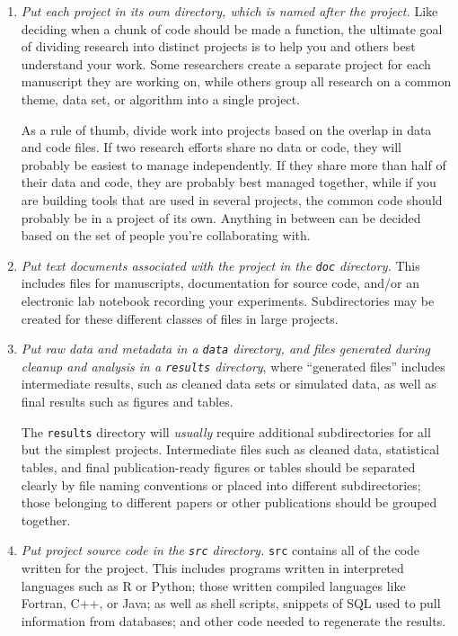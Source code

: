 \documentclass[10pt]{article}
\newcommand{\recommend}[1]{\textit{#1}}
\begin{document}
\begin{enumerate}

\item
  \recommend{Put each project in its own directory, which is named
    after the project.}  Like deciding when a chunk of code should be
  made a function, the ultimate goal of dividing research into
  distinct projects is to help you and others best understand your
  work. Some researchers create a separate project for each manuscript
  they are working on, while others group all research on a common
  theme, data set, or algorithm into a single project.

  As a rule of thumb, divide work into projects based on the overlap
  in data and code files. If two research efforts share no data or
  code, they will probably be easiest to manage independently. If they
  share more than half of their data and code, they are probably best
  managed together, while if you are building tools that are used in
  several projects, the common code should probably be in a project of
  its own. Anything in between can be decided based on the set of
  people you're collaborating with.

\item
  \recommend{Put text documents associated with the project in the
    \texttt{doc} directory.} This includes files for manuscripts,
  documentation for source code, and/or an electronic lab notebook
  recording your experiments.  Subdirectories may be created for these
  different classes of files in large projects.

\item
  \recommend{Put raw data and metadata in a \texttt{data} directory,
    and files generated during cleanup and analysis in a
    \texttt{results} directory}, where ``generated files'' includes
  intermediate results, such as cleaned data sets or simulated data,
  as well as final results such as figures and tables.

  The \texttt{results} directory will \emph{usually}
  require additional subdirectories for all but the simplest
  projects. Intermediate files such as cleaned data, statistical
  tables, and final publication-ready figures or tables should be
  separated clearly by file naming conventions or placed into
  different subdirectories; those belonging to different papers or
  other publications should be grouped together.

\item
  \recommend{Put project source code in the \texttt{src} directory.}
  \texttt{src} contains all of the code written for the project. This includes
  programs written in interpreted languages
  such as R or Python; those written compiled languages like
  Fortran, C++, or Java; as well as shell scripts, snippets of SQL used to pull
  information from databases; and other code needed to regenerate
  the results.


\end{enumerate}
\end{document}
